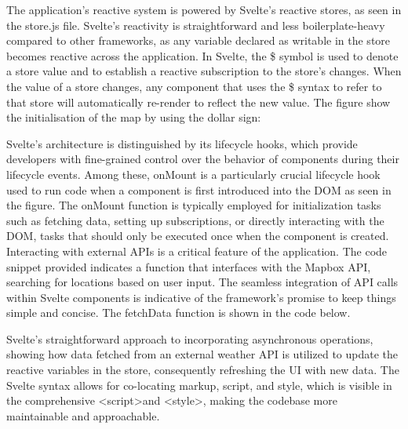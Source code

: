 The application's reactive system is powered by Svelte's reactive stores, as seen in the store.js file. Svelte's reactivity is straightforward and less boilerplate-heavy compared to other frameworks, as any variable declared as writable in the store becomes reactive across the application. In Svelte, the \$ symbol is used to denote a store value and to establish a reactive subscription to the store's changes. When the value of a store changes, any component that uses the \$ syntax to refer to that store will automatically re-render to reflect the new value. The figure show the initialisation of the map by using the dollar sign:



Svelte's architecture is distinguished by its lifecycle hooks, which provide developers with fine-grained control over the behavior of components during their lifecycle events. Among these, onMount is a particularly crucial lifecycle hook used to run code when a component is first introduced into the DOM as seen in the figure.
The onMount function is typically employed for initialization tasks such as fetching data, setting up subscriptions, or directly interacting with the DOM, tasks that should only be executed once when the component is created.
Interacting with external APIs is a critical feature of the application. The code snippet provided indicates a function that interfaces with the Mapbox API, searching for locations based on user input. The seamless integration of API calls within Svelte components is indicative of the framework's promise to keep things simple and concise. The fetchData function is shown in the code below.



Svelte's straightforward approach to incorporating asynchronous operations, showing how data fetched from an external weather API is utilized to update the reactive variables in the store, consequently refreshing the UI with new data.
The Svelte syntax allows for co-locating markup, script, and style, which is visible in the comprehensive \textless script\textgreater and \textless style\textgreater, making the codebase more maintainable and approachable.


